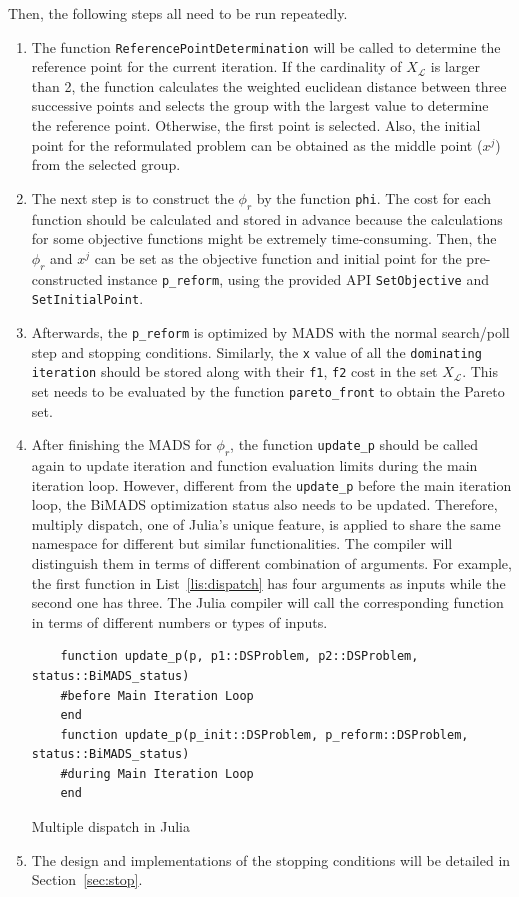 \documentclass[11pt,oneside,onecolumn,openright]{article}
\begin{document}
  Then, the following steps all need to be run repeatedly.
  \begin{enumerate}
    \item The function \verb|ReferencePointDetermination| will be called to determine the reference point for the current iteration. If the cardinality of $X_\mathcal{L}$ is larger than 2, the function calculates the weighted euclidean distance between three successive points and selects the group with the largest value to determine the reference point. Otherwise, the first point is selected. Also, the initial point for the reformulated problem can be obtained as the middle point ($x^j$) from the selected group.
    \item The next step is to construct the $\phi_r$ by the function \verb|phi|. The cost for each function should be calculated and stored in advance because the calculations for some objective functions might be extremely time-consuming. Then, the $\phi_r$ and $x^j$ can be set as the objective function and initial point for the pre-constructed instance \verb|p_reform|, using the provided API \verb|SetObjective| and \verb|SetInitialPoint|.
    \item Afterwards, the \verb|p_reform| is optimized by MADS with the normal search/poll step and stopping conditions. Similarly, the \verb|x| value of all the \verb|dominating iteration| should be stored along with their \verb|f1|, \verb|f2| cost in the set $X_\mathcal{L}$. This set needs to be evaluated by the function \verb|pareto_front| to obtain the Pareto set.
    \item After finishing the MADS for $\phi_r$, the function \verb|update_p| should be called again to update iteration and function evaluation limits during the main iteration loop. However, different from the \verb|update_p| before the main iteration loop, the BiMADS optimization status also needs to be updated. Therefore, multiply dispatch, one of Julia's unique feature, is applied to share the same namespace for different but similar functionalities. The compiler will distinguish them in terms of different combination of arguments. For example, the first function in List~\ref{lis:dispatch} has four arguments as inputs while the second one has three. The Julia compiler will call the corresponding function in terms of different numbers or types of inputs.

        \begin{listing}[ht]
      \begin{verbatim}
    function update_p(p, p1::DSProblem, p2::DSProblem, status::BiMADS_status)
    #before Main Iteration Loop
    end
    function update_p(p_init::DSProblem, p_reform::DSProblem, status::BiMADS_status)
    #during Main Iteration Loop
    end
    \end{verbatim}
  \caption{Multiple dispatch in Julia}
  \label{lis:dispatch}
  \end{listing}
    \item The design and implementations of the stopping conditions will be detailed in Section~\ref{sec:stop}.
  \end{enumerate}
\end{document}

